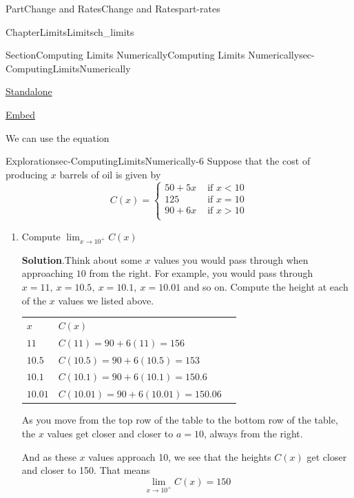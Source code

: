 \documentclass[oneside,10pt,]{tufte-book}
\newcommand{\blocktitlefont}{\relax}
\newcommand{\tabularfont}{\relax}
\numberwithin{equation}{chapter}
\newcommand{\hrulemedium}{\noalign{\hrule height 0.07em}}
\newcommand{\lt}{<}
\newcommand{\gt}{>}
\begin{document}
\begin{partptx}{Part}{Change and Rates}{}{Change and Rates}{}{}{part-rates}
\begin{chapterptx}{Chapter}{Limits}{}{Limits}{}{}{ch_limits}
\begin{sectionptx}{Section}{Computing Limits Numerically}{}{Computing Limits Numerically}{}{}{sec-ComputingLimitsNumerically}
\begin{sidebyside}{2}{0.075}{0.075}{0.17}
\begin{sbspanel}{0.21}
\href{http://webwork.bridgew.edu/oer/functions_at_work/sec-ComputingLimitsNumerically-4.html}{Standalone}%
\par
\href{http://webwork.bridgew.edu/oer/functions_at_work/sec-ComputingLimitsNumerically-4-if.html}{Embed}%
\end{sbspanel}%
\end{sidebyside}%
\par
We can use the equation%
\begin{exploration}{Exploration}{}{sec-ComputingLimitsNumerically-6}%
Suppose that the cost of producing \(x\) barrels of oil is given by%
\begin{equation*}
C(x) = 
\begin{cases}
50 + 5x & \text{ if } x\lt 10 \\ 
125     & \text{ if } x = 10 \\ 
90 + 6x & \text{ if } x\gt 10 \\ 
\end{cases}
\end{equation*}
%
\begin{enumerate}[font=\bfseries,label=(\alph*),ref=\alph*]%
\item{}Compute \(\displaystyle \lim_{x\rightarrow 10^+} C(x)\)%
\par\smallskip%
\noindent\textbf{\blocktitlefont Solution}.\hypertarget{sec-ComputingLimitsNumerically-6-2-2}{}\quad{}Think about some \(x\) values you would pass through when approaching \(10\) from the right. For example, you would pass through \(x=11,\ x=10.5,\ x=10.1,\ x=10.01\) and so on. Compute the height at each of the \(x\) values we listed above. \begin{center}%
{\tabularfont%
\begin{tabular}{lBl}
\(x\)&\(C(x)\)\tabularnewline\hrulemedium
\(11\)&\(C(11) =  90 + 6(11) = 156  \)\tabularnewline\hrulemedium
\(10.5\)&\(C(10.5) = 90 + 6(10.5) = 153  \)\tabularnewline\hrulemedium
\(10.1\)&\(C(10.1) =  90 + 6(10.1) =150.6  \)\tabularnewline\hrulemedium
\(10.01\)&\(C(10.01) = 90 + 6(10.01) =150.06   \)
\end{tabular}
}%
\end{center}%
 As you move from the top row of the table to the bottom row of the table, the \(x\) values get closer and closer to \(a=10\), always from the right.%
\par
And as these \(x\) values approach 10, we see that the heights \(C(x)\) get closer and closer to 150.  That means%
\begin{equation*}
\lim_{x\rightarrow 10^+} C(x) = 150

\end{equation*}
\end{enumerate}
\end{exploration}
\end{sectionptx}
\end{chapterptx}
\end{partptx}
\end{document}

